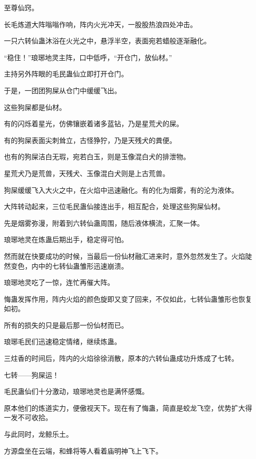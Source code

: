 
\begin{this_body}



至尊仙窍。

长毛炼道大阵嗡嗡作响，阵内火光冲天，一股股热浪四处冲击。

一只六转仙蛊沐浴在火光之中，悬浮半空，表面宛若蜡般逐渐融化。

“稳住！”琅琊地灵主阵，口中低呼，“开仓门，放仙材。”

主持另外阵眼的毛民蛊仙立即打开仓门。

于是，一团团狗屎从仓门中缓缓飞出。

这些狗屎都是仙材。

有的闪烁着星光，仿佛镶嵌着诸多蓝钻，乃是星荒犬的屎。

有的狗屎表面尖刺耸立，古怪狰狞，乃是天残犬的粪便。

也有的狗屎洁白无瑕，宛若白玉，则是玉像混白犬的排泄物。

星荒犬乃是荒兽，天残犬、玉像混白犬则是上古荒兽。

狗屎缓缓飞入大火之中，在火焰中迅速融化。有的化为烟雾，有的沦为液体。

大阵转动起来，三位毛民蛊仙接连出手，相互配合，处理这些狗屎仙材。

先是烟雾弥漫，附着到六转仙蛊周围，随后液体横流，汇聚一体。

琅琊地灵在炼蛊后期出手，稳定得可怕。

然而就在快要成功的时候，当最后一份仙材融汇进来时，意外忽然发生了。火焰陡然变色，内中的七转仙蛊雏形迅速崩溃。

琅琊地灵吃了一惊，连忙再催大阵。

悔蛊发挥作用，阵内火焰的颜色旋即又变了回来，不仅如此，七转仙蛊雏形也恢复如初。

所有的损失的只是最后那一份仙材而已。

琅琊毛民们迅速稳定情绪，继续炼蛊。

三炷香的时间后，阵内的火焰徐徐消散，原本的六转仙蛊成功升炼成了七转。

七转——狗屎运！

毛民蛊仙们十分激动，琅琊地灵也是满怀感慨。

原本他们的炼道实力，便傲视天下。现在有了悔蛊，简直是蛟龙飞空，优势扩大得一发不可收拾。

与此同时，龙鲸乐土。

方源盘坐在云端，和蜂将等人看着庙明神飞上飞下。


\end{this_body}
